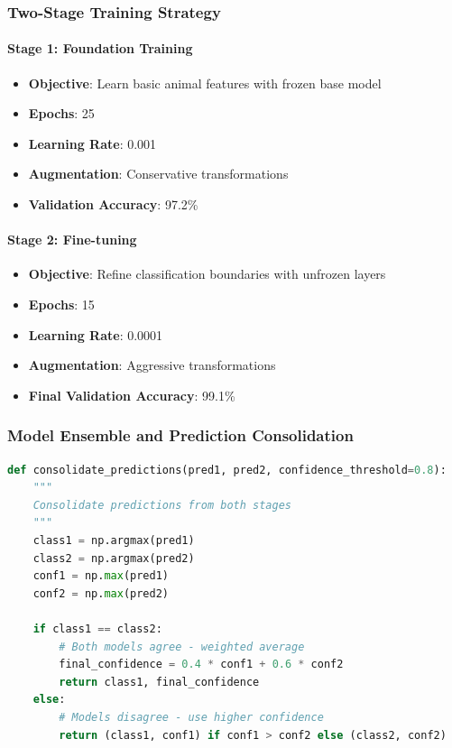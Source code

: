 \documentclass[12pt, a4paper]{article}
\begin{document}
\subsubsection{Two-Stage Training Strategy}
\paragraph{Stage 1: Foundation Training}
\begin{itemize}
    \item \textbf{Objective}: Learn basic animal features with frozen base model
    \item \textbf{Epochs}: 25
    \item \textbf{Learning Rate}: 0.001
    \item \textbf{Augmentation}: Conservative transformations
    \item \textbf{Validation Accuracy}: 97.2\%
\end{itemize}

\paragraph{Stage 2: Fine-tuning}
\begin{itemize}
    \item \textbf{Objective}: Refine classification boundaries with unfrozen layers
    \item \textbf{Epochs}: 15
    \item \textbf{Learning Rate}: 0.0001
    \item \textbf{Augmentation}: Aggressive transformations
    \item \textbf{Final Validation Accuracy}: 99.1\%
\end{itemize}

\subsubsection{Model Ensemble and Prediction Consolidation}
\begin{lstlisting}[language=Python, caption=Dual-Stage Prediction Consolidation]
def consolidate_predictions(pred1, pred2, confidence_threshold=0.8):
    """
    Consolidate predictions from both stages
    """
    class1 = np.argmax(pred1)
    class2 = np.argmax(pred2)
    conf1 = np.max(pred1)
    conf2 = np.max(pred2)
    
    if class1 == class2:
        # Both models agree - weighted average
        final_confidence = 0.4 * conf1 + 0.6 * conf2
        return class1, final_confidence
    else:
        # Models disagree - use higher confidence
        return (class1, conf1) if conf1 > conf2 else (class2, conf2)
\end{lstlisting}
\end{document}
